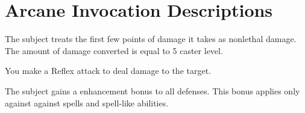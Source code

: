 \section{Arcane Invocation Descriptions}

\begin{spelleffect}
    The subject treats the first few points of damage it takes as nonlethal damage. The amount of damage converted is equal to 5 \add caster level.
\end{spelleffect}

\begin{spelleffect}
    You make a Reflex attack to deal damage to the target.
\end{spelleffect}

\begin{spelleffect}
    The subject gains a  enhancement bonus to all defenses. \bonusscalingdescription This bonus applies only against against spells and spell-like abilities.
\end{spelleffect}

